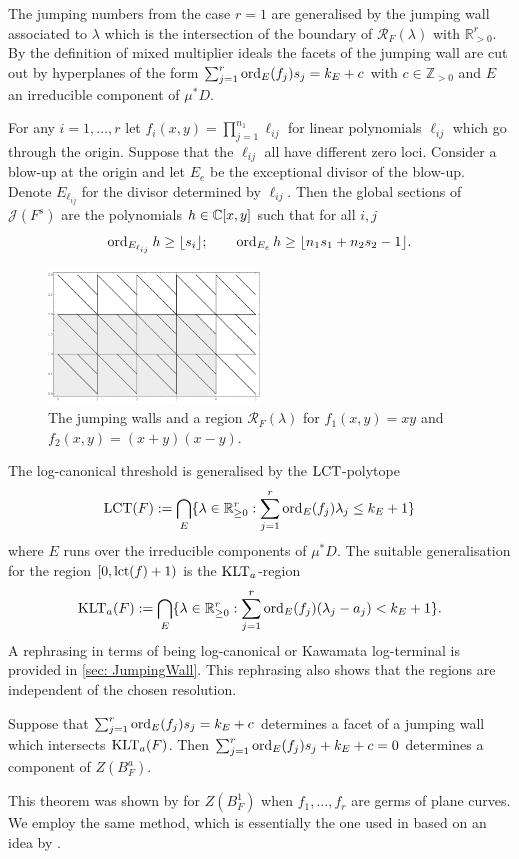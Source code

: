 The jumping numbers from the case $r=1$ are generalised by the jumping wall associated to $\lambda$ which is the intersection of the boundary of $\mathcal{R}_F(\lambda)$ with $\mathbb{R}_{>0}^r$.
By the definition of mixed multiplier ideals the facets of the jumping wall are cut out by hyperplanes of the form
$\sum_{j=1}^r\operatorname{ord}_E(f_j)s_j = k_E + c$
with $c\in \mathbb{Z}_{>0}$ and $E$ an irreducible component of $\mu^*D$.
\begin{example}
  For any $i=1,\ldots,r$ let $f_i(x,y) = \prod_{j=1}^{n_1} \ell_{ij}$ for linear polynomials $\ell_{ij}$ which go through the origin.
  Suppose that the $\ell_{ij}$ all have different zero loci.
  Consider a blow-up at the origin and let $E_{e}$ be the exceptional divisor of the blow-up.
  Denote $E_{\ell_{ij}}$ for the divisor determined by $\ell_{ij}$.
  Then the global sections of $\mathcal{J}(F^s)$ are the polynomials $h\in \mathbb{C}[x,y]$ such that for all $i,j$
  $$\operatorname{ord}_{E_{\ell_{ij}}} h\geq \lfloor s_i \rfloor;\qquad \operatorname{ord}_{E_{e}} h \geq \lfloor n_1s_1 + n_2s_2 - 1 \rfloor. $$
  \begin{figure}[h!]
    \centering
    \includegraphics[width = 0.5\textwidth]{Figures/LargeJumps}
    \caption{The jumping walls and a region $\mathcal{R}_F(\lambda)$ for $f_1(x,y) =xy$ and $f_2(x,y)=(x+y)(x-y)$.}
  \end{figure}
\end{example}
The log-canonical threshold is generalised by the $\operatorname{LCT}$-polytope
$$ \operatorname{LCT}(F) :=  \bigcap_{E}\{\lambda\in \mathbb{R}_{\geq 0}^r : \sum_{j=1}^r \operatorname{ord}_E(f_j)\lambda_j \leq k_E + 1\}$$
where $E$ runs over the irreducible components of $\mu^*D$.
The suitable generalisation for the region $[0,\operatorname{lct}(f) + 1)$ is the $\operatorname{KLT}_{a}$-region
$$\operatorname{KLT}_{a}(F):= \bigcap_{E}\{\lambda\in \mathbb{R}_{\geq 0}^r: \sum_{j=1}^r \operatorname{ord}_E(f_j)(\lambda_j - a_j) < k_E + 1\}.$$
A rephrasing in terms of being log-canonical or Kawamata log-terminal is provided in \cref{sec: JumpingWall}.
This rephrasing also shows that the regions are independent of the chosen resolution.
\begin{theorem}\label{thm: JumpingWall}
  Suppose that $\sum_{j=1}^r \operatorname{ord}_E(f_j)s_j = k_E + c$ determines a facet of a jumping wall which intersects $\operatorname{KLT}_{a}(F)$.
  Then $\sum_{j=1}^r \operatorname{ord}_E(f_j)s_j + k_E + c = 0$ determines a component of $Z(B_F^a)$.
\end{theorem}
This theorem was shown by \cite{cassou2011multivariable} for $Z(B_F^{1})$ when $f_1,\ldots, f_r$ are germs of plane curves.
We employ the same method, which is essentially the one used in \cite[Theorem B]{ClassicalJump} based on an idea by \cite{kollar1997singularities}.

